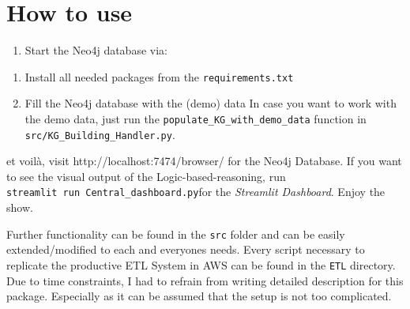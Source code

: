 \section{How to use}\label{how-to-use}

\begin{enumerate}
\def\labelenumi{\arabic{enumi}.}
\tightlist
\item
  Start the Neo4j database via:
\end{enumerate}

\begin{Shaded}
\begin{Highlighting}[]
\end{Highlighting}
\end{Shaded}

\begin{enumerate}
\def\labelenumi{\arabic{enumi}.}
\setcounter{enumi}{1}
\tightlist
\item
  Install all needed packages from the \texttt{requirements.txt}
\item
  Fill the Neo4j database with the (demo) data In case you want to work
  with the demo data, just run the
  \texttt{populate\_KG\_with\_demo\_data} function in
  \texttt{src/KG\_Building\_Handler.py}.
\end{enumerate}

et voilà, visit http://localhost:7474/browser/ for the Neo4j Database.
If you want to see the visual output of the Logic-based-reasoning, run
\texttt{streamlit\ run\ Central\_dashboard.py}for the \emph{Streamlit
Dashboard}. Enjoy the show.

Further functionality can be found in the \texttt{src} folder and can be
easily extended/modified to each and everyones needs. Every script
necessary to replicate the productive ETL System in AWS can be found in
the \texttt{ETL} directory. Due to time constraints, I had to refrain
from writing detailed description for this package. Especially as it can
be assumed that the setup is not too complicated.
